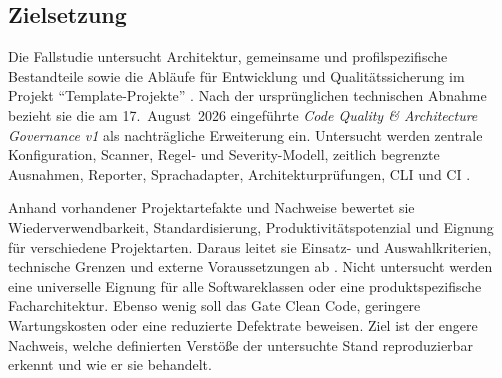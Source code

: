 \subsection{Zielsetzung}
\label{subsec:zielsetzung}

Die Fallstudie untersucht Architektur, gemeinsame und profilspezifische
Bestandteile sowie die Abläufe für Entwicklung und Qualitätssicherung im
Projekt \enquote{Template-Projekte}
\parencite{kleiveist2026architecture,kleiveist2026tooling}. Nach der
ursprünglichen technischen Abnahme bezieht sie die am 17.~August~2026
eingeführte \emph{Code Quality \& Architecture Governance v1} als nachträgliche
Erweiterung ein. Untersucht werden zentrale Konfiguration, Scanner,
Regel- und Severity-Modell, zeitlich begrenzte Ausnahmen, Reporter,
Sprachadapter, Architekturprüfungen, CLI und CI
\parencite{kleiveist2026quality-policy,kleiveist2026governance-commit}.

Anhand vorhandener Projektartefakte und Nachweise bewertet sie
Wiederverwendbarkeit, Standardisierung, Produktivitätspotenzial und Eignung für
verschiedene Projektarten. Daraus leitet sie Einsatz- und Auswahlkriterien,
technische Grenzen und externe Voraussetzungen ab
\parencite{kleiveist2026acceptance}. Nicht untersucht werden eine universelle
Eignung für alle Softwareklassen oder eine produktspezifische Facharchitektur.
Ebenso wenig soll das Gate Clean Code, geringere Wartungskosten oder eine
reduzierte Defektrate beweisen. Ziel ist der engere Nachweis, welche definierten
Verstöße der untersuchte Stand reproduzierbar erkennt und wie er sie behandelt.
